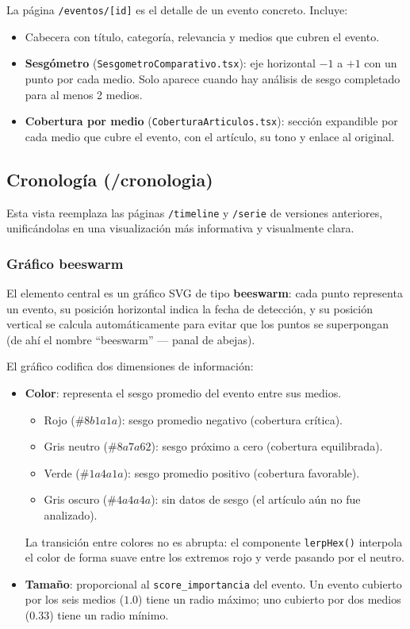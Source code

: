\documentclass[12pt,a4paper]{article}
\begin{document}
La página \texttt{/eventos/[id]} es el detalle de un evento concreto. Incluye:
\begin{itemize}[nosep]
  \item Cabecera con título, categoría, relevancia y medios que cubren el evento.
  \item \textbf{Sesgómetro} (\texttt{SesgometroComparativo.tsx}): eje horizontal $-1$ a $+1$ con un punto por cada medio. Solo aparece cuando hay análisis de sesgo completado para al menos 2 medios.
  \item \textbf{Cobertura por medio} (\texttt{CoberturaArticulos.tsx}): sección expandible por cada medio que cubre el evento, con el artículo, su tono y enlace al original.
\end{itemize}

\subsection{Cronología (/cronologia)}

Esta vista reemplaza las páginas \texttt{/timeline} y \texttt{/serie} de versiones anteriores, unificándolas en una visualización más informativa y visualmente clara.

\subsubsection*{Gráfico beeswarm}

El elemento central es un gráfico SVG de tipo \textbf{beeswarm}: cada punto representa un evento, su posición horizontal indica la fecha de detección, y su posición vertical se calcula automáticamente para evitar que los puntos se superpongan (de ahí el nombre ``beeswarm'' --- panal de abejas).

El gráfico codifica dos dimensiones de información:

\begin{itemize}[nosep]
  \item \textbf{Color}: representa el sesgo promedio del evento entre sus medios.
    \begin{itemize}[nosep]
      \item Rojo ($\#8b1a1a$): sesgo promedio negativo (cobertura crítica).
      \item Gris neutro ($\#8a7a62$): sesgo próximo a cero (cobertura equilibrada).
      \item Verde ($\#1a4a1a$): sesgo promedio positivo (cobertura favorable).
      \item Gris oscuro ($\#4a4a4a$): sin datos de sesgo (el artículo aún no fue analizado).
    \end{itemize}
    La transición entre colores no es abrupta: el componente \texttt{lerpHex()} interpola el color de forma suave entre los extremos rojo y verde pasando por el neutro.
  \item \textbf{Tamaño}: proporcional al \texttt{score\_importancia} del evento. Un evento cubierto por los seis medios ($1.0$) tiene un radio máximo; uno cubierto por dos medios ($0.33$) tiene un radio mínimo.
\end{itemize}
\end{document}
